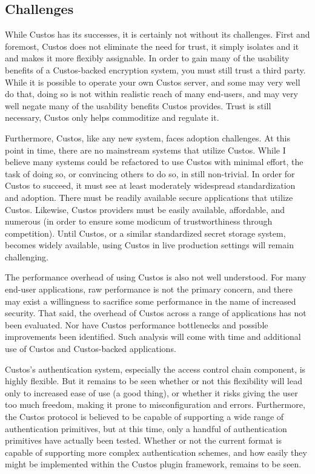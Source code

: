 \subsection{Challenges}

While Custos has its successes, it is certainly not without its
challenges. First and foremost, Custos does not eliminate the need for
trust, it simply isolates and it and makes it more flexibly
assignable. In order to gain many of the usability benefits of a
Custos-backed encryption system, you must still trust a third
party. While it is possible to operate your own Custos server, and
some may very well do that, doing so is not within realistic reach of
many end-users, and may very well negate many of the usability
benefits Custos provides. Trust is still necessary, Custos only helps
commoditize and regulate it.

Furthermore, Custos, like any new system, faces adoption
challenges. At this point in time, there are no mainstream systems
that utilize Custos. While I believe many systems could be refactored
to use Custos with minimal effort, the task of doing so, or convincing
others to do so, in still non-trivial. In order for Custos to succeed,
it must see at least moderately widespread standardization and
adoption. There must be readily available secure applications that
utilize Custos. Likewise, Custos providers must be easily available,
affordable, and numerous (in order to ensure some modicum of
trustworthiness through competition). Until Custos, or a similar
standardized secret storage system, becomes widely available, using
Custos in live production settings will remain challenging.

The performance overhead of using Custos is also not well
understood. For many end-user applications, raw performance is not the
primary concern, and there may exist a willingness to sacrifice some
performance in the name of increased security. That said, the overhead
of Custos across a range of applications has not been evaluated. Nor
have Custos performance bottlenecks and possible improvements been
identified. Such analysis will come with time and additional use of
Custos and Custos-backed applications.

Custos's authentication system, especially the access control chain
component, is highly flexible. But it remains to be seen whether or
not this flexibility will lead only to increased ease of use (a good
thing), or whether it risks giving the user too much freedom, making
it prone to misconfiguration and errors. Furthermore, the Custos
protocol is believed to be capable of supporting a wide range of
authentication primitives, but at this time, only a handful of
authentication primitives have actually been tested. Whether or not
the current format is capable of supporting more complex
authentication schemes, and how easily they might be implemented
within the Custos plugin framework, remains to be seen.

